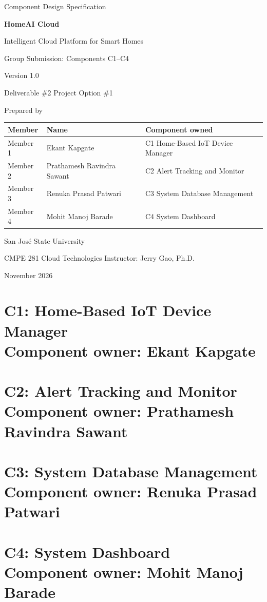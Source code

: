 \documentclass[11pt,letterpaper]{article}
\newcommand{\compheadtitle}{Component Design}
\newcommand{\componentpart}[3]{%
  \clearpage
  \renewcommand{\compheadtitle}{#1 #2}%
  \part[#1 #2 (#3)]{#1: #2\\[6pt]\large Component owner: #3}}
\begin{document}
\hypersetup{pageanchor=false}
\begin{titlepage}
  \centering
  \vspace*{1.2cm}
  {\large Component Design Specification\par}
  \vspace{0.8cm}
  {\Huge\bfseries HomeAI Cloud\par}
  \vspace{0.3cm}
  {\LARGE Intelligent Cloud Platform for Smart Homes\par}
  \vspace{0.9cm}
  {\Large Group Submission: Components C1--C4\par}
  \vspace{0.3cm}
  {\large Version 1.0\par}
  \vspace{0.2cm}
  {\large Deliverable \#2 \textperiodcentered{} Project Option \#1\par}
  \vfill
  {\large Prepared by\par}
  \vspace{0.3cm}
  \begin{tabular}{lL{5.2cm}L{6.2cm}}
    \toprule
    \textbf{Member} & \textbf{Name} & \textbf{Component owned} \\
    \midrule
    Member 1 & Ekant Kapgate              & C1 Home-Based IoT Device Manager \\
    Member 2 & Prathamesh Ravindra Sawant & C2 Alert Tracking and Monitor \\
    Member 3 & Renuka Prasad Patwari      & C3 System Database Management \\
    Member 4 & Mohit Manoj Barade         & C4 System Dashboard \\
    \bottomrule
  \end{tabular}
  \vfill
  {\large San Jos\'e State University\par}
  {\large CMPE 281 Cloud Technologies \textperiodcentered{} Instructor: Jerry Gao, Ph.D.\par}
  {\large November 2026\par}
\end{titlepage}
\hypersetup{pageanchor=true}

\tableofcontents
\clearpage
{}

\componentpart{C1}{Home-Based IoT Device Manager}{Ekant Kapgate}


\componentpart{C2}{Alert Tracking and Monitor}{Prathamesh Ravindra Sawant}


\componentpart{C3}{System Database Management}{Renuka Prasad Patwari}


\componentpart{C4}{System Dashboard}{Mohit Manoj Barade}


\clearpage
\renewcommand{\compheadtitle}{References}

\end{document}
